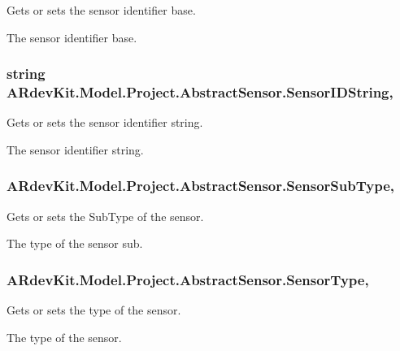 Gets or sets the sensor identifier base. 

The sensor identifier base. \hypertarget{class_a_rdev_kit_1_1_model_1_1_project_1_1_abstract_sensor_a054724aa9c411a5f813d977c7c1f620c}{
\subsubsection[{Sensor\-I\-D\-String}]{\setlength{\rightskip}{0pt plus 5cm}string A\-Rdev\-Kit.\-Model.\-Project.\-Abstract\-Sensor.\-Sensor\-I\-D\-String\hspace{0.3cm}{\ttfamily [get]}, {\ttfamily [set]}}}\label{class_a_rdev_kit_1_1_model_1_1_project_1_1_abstract_sensor_a054724aa9c411a5f813d977c7c1f620c}


Gets or sets the sensor identifier string. 

The sensor identifier string. \hypertarget{class_a_rdev_kit_1_1_model_1_1_project_1_1_abstract_sensor_a092d1bd99165833488f9ce744a1bf65d}{
\subsubsection[{Sensor\-Sub\-Type}]{ A\-Rdev\-Kit.\-Model.\-Project.\-Abstract\-Sensor.\-Sensor\-Sub\-Type\hspace{0.3cm}{\ttfamily [get]}, {\ttfamily [set]}}}\label{class_a_rdev_kit_1_1_model_1_1_project_1_1_abstract_sensor_a092d1bd99165833488f9ce744a1bf65d}


Gets or sets the Sub\-Type of the sensor. 

The type of the sensor sub. \hypertarget{class_a_rdev_kit_1_1_model_1_1_project_1_1_abstract_sensor_a66bde8348688b03400befc56c6ce8384}{
\subsubsection[{Sensor\-Type}]{ A\-Rdev\-Kit.\-Model.\-Project.\-Abstract\-Sensor.\-Sensor\-Type\hspace{0.3cm}{\ttfamily [get]}, {\ttfamily [set]}}}\label{class_a_rdev_kit_1_1_model_1_1_project_1_1_abstract_sensor_a66bde8348688b03400befc56c6ce8384}


Gets or sets the type of the sensor. 

The type of the sensor. 